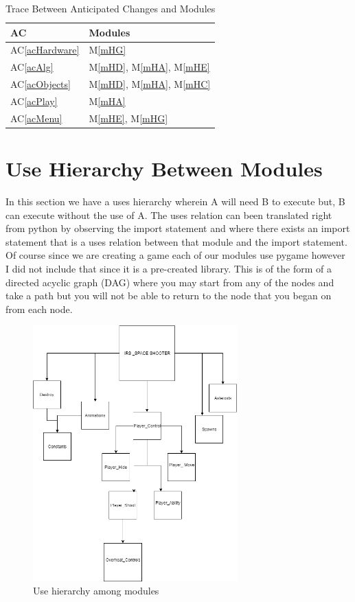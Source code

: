 \documentclass[12pt, titlepage]{article}
\newcommand{\acref}[1]{AC\ref{#1}}
\newcommand{\mref}[1]{M\ref{#1}}
\begin{document}
\begin{table}[H]
\centering
\begin{tabular}{p{} p{}}
\toprule
\textbf{AC} & \textbf{Modules}\\
\midrule
\acref{acHardware} & \mref{mHG}\\
\acref{acAlg} & \mref{mHD}, \mref{mHA}, \mref{mHE}\\
\acref{acObjects} & \mref{mHD}, \mref{mHA}, \mref{mHC}\\
\acref{acPlay} & \mref{mHA}\\
\acref{acMenu} & \mref{mHE}, \mref{mHG}\\
\bottomrule
\end{tabular}
\caption{Trace Between Anticipated Changes and Modules}
\label{TblACT}
\end{table}

\section{Use Hierarchy Between Modules} \label{SecUse}

In this section we have a uses hierarchy wherein A will need B to execute but, B can execute without the use of A. The uses relation can been translated right from python by observing the import statement and where there exists an import statement that is a uses relation between that module and the import statement. Of course since we are creating a game each of our modules use pygame however I did not include that since it is a pre-created library. This is of the form of a directed acyclic graph (DAG) where you may start from any of the nodes and take a path but you will not be able to return to the node that you began on from each node.

\begin{figure}[H]
\centering
\includegraphics[width=0.7\textwidth]{pic1}
\caption{Use hierarchy among modules}
\label{FigUH}
\end{figure}
\end{document}
